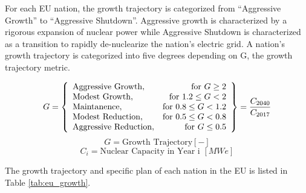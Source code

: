 For each \gls{EU} nation, the growth trajectory is categorized from
``Aggressive Growth'' to ``Aggressive Shutdown''. Aggressive growth is
characterized by a rigorous expansion of nuclear power while 
Aggressive Shutdown is characterized as a transition to rapidly
de-nuclearize the nation's electric grid. A nation's growth trajectory is
categorized into five degrees depending on G, the growth trajectory metric.
  
 \[
 G = \left\{\begin{array}{lr}
 \text{Aggressive Growth}, & \text{for } G \geq 2\\
 \text{Modest Growth}, & \text{for } 1.2 \leq G < 2\\
 \text{Maintanence}, & \text{for } 0.8 \leq G < 1.2 \\
 \text{Modest Reduction}, & \text{for } 0.5 \leq G< 0.8\\
 \text{Aggressive Reduction}, & \text{for } G \leq 0.5
 \end{array}\right\} = \frac{C_{2040}}{C_{2017}}\\\\
 \]
 \[
  G = \text{Growth Trajectory} [-] 
 \]
 \[
 C_{i} = \text{Nuclear Capacity in Year i  } [MWe]
 \]
 
The growth trajectory and specific plan of each nation in the \gls{EU} 
is listed in Table \ref{tab:eu_growth}.

